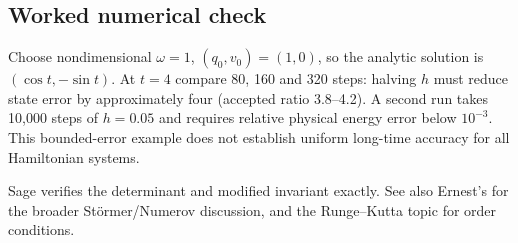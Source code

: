 \subsection{Worked numerical check}
Choose nondimensional $\omega=1$, $(q_0,v_0)=(1,0)$, so the analytic solution
is $(\cos t,-\sin t)$. At $t=4$ compare 80, 160 and 320 steps: halving $h$
must reduce state error by approximately four (accepted ratio 3.8--4.2).
A second run takes 10,000 steps of $h=0.05$ and requires relative physical
energy error below $10^{-3}$. This bounded-error example does not establish
uniform long-time accuracy for all Hamiltonian systems.

Sage verifies the determinant and modified invariant exactly. See also
Ernest's  for the broader St\"ormer/Numerov
discussion, and the Runge--Kutta topic for order conditions.
